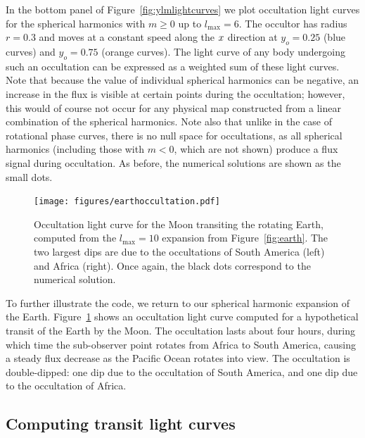 \documentclass[modern]{aastex61}
\begin{document}
In the bottom panel of Figure~\ref{fig:ylmlightcurves} we plot
occultation light curves for the spherical harmonics with $m \ge 0$
up to $l_\mathrm{max} = 6$. The occultor has radius $r = 0.3$ and
moves at a constant speed along the $\mbox{$x$}$ direction at $y_o = 0.25$
(blue curves) and $y_o = 0.75$ (orange curves). The light curve of
any body undergoing such an occultation can be expressed as a weighted
sum of these light curves. Note that because the value of individual
spherical harmonics can be negative, an increase in the flux is visible
at certain points during the occultation; however, this would of course not
occur for any physical map constructed from a linear combination of
the spherical harmonics. Note also that unlike in the case of rotational phase curves,
there is no null space for occultations, as all spherical harmonics (including
those with $m < 0$, which are not shown) produce a flux signal during
occultation. As before, the numerical solutions are shown as the small dots.

%
\begin{figure}[ht!]
    \begin{centering}
    \texttt{[image: figures/earthoccultation.pdf]}
    \caption{\label{fig:earthoccultation}
             Occultation light curve for the Moon transiting the
             rotating Earth,
             computed from the $l_\mathrm{max} = 10$ expansion from
             Figure~\ref{fig:earth}. The two largest dips are due
             to the occultations of South America (left) and Africa
             (right). Once again, the black dots correspond to the
             numerical solution.}
    \end{centering}
\end{figure}
%

To further illustrate the code, we return to our spherical harmonic
expansion of the Earth.
Figure~\ref{fig:earthoccultation} shows an occultation light curve
computed for a hypothetical transit of the Earth by the Moon. The
occultation lasts about four hours, during which time
the sub-observer point rotates from Africa to South America, causing a
steady flux decrease as the Pacific Ocean rotates into view. The
occultation is double-dipped: one dip due to the occultation of South
America, and one dip due to the occultation of Africa.

\subsection{Computing transit light curves}
\label{sec:starrytransits}
\end{document}
